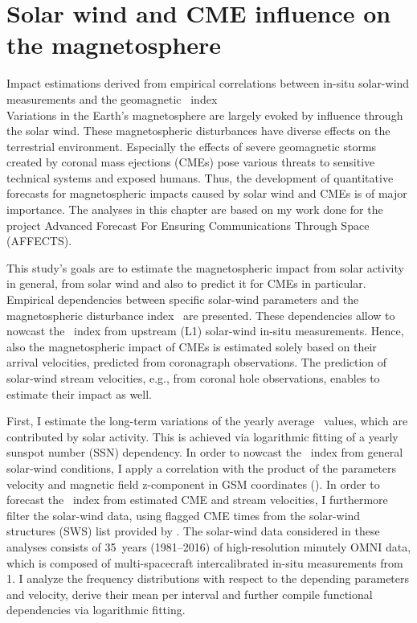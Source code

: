 
\chapter{Solar wind and CME influence on the magnetosphere}
\label{chap:chapter2}

Impact estimations derived from empirical correlations between in-situ solar-wind measurements and the geomagnetic \Kp{}~index\\


Variations in the Earth's magnetosphere are largely evoked by influence through the solar wind. These magnetospheric disturbances have diverse effects on the terrestrial environment. Especially the effects of severe geomagnetic storms created by coronal mass ejections (CMEs) pose various threats to sensitive technical systems and exposed humans. Thus, the development of quantitative forecasts for magnetospheric impacts caused by solar wind and CMEs is of major importance. The analyses in this chapter are based on my work done for the project Advanced Forecast For Ensuring Communications Through Space (AFFECTS).

This study's goals are to estimate the magnetospheric impact from solar activity in general, from solar wind and also to predict it for CMEs in particular. Empirical dependencies between specific solar-wind parameters and the magnetospheric disturbance index~\Kp{} are presented. These dependencies allow to nowcast the \Kp~index from upstream (L1) solar-wind in-situ measurements. Hence, also the magnetospheric impact of CMEs is estimated solely based on their arrival velocities, predicted from coronagraph observations. The prediction of solar-wind stream velocities, e.g., from coronal hole observations, enables to estimate their impact as well.

First, I estimate the long-term variations of the yearly average \Kp{}~values, which are contributed by solar activity. This is achieved via logarithmic fitting of a yearly sunspot number (SSN) dependency. In order to nowcast the \Kp~index from general solar-wind conditions, I apply a correlation with the product of the parameters velocity and magnetic field z-component in GSM coordinates (\vBz{}). In order to forecast the \Kp~index from estimated CME and stream velocities, I furthermore filter the solar-wind data, using flagged CME times from the solar-wind structures (SWS) list provided by \citet{Richardson2012}. The solar-wind data considered in these analyses consists of 35~years (1981--2016) of high-resolution minutely OMNI data, which is composed of multi-spacecraft intercalibrated in-situ measurements from \SI{1}{\au}. I analyze the \Kp{} frequency distributions with respect to the depending parameters \vBz{} and velocity, derive their mean \Kp{} per interval and further compile functional dependencies via logarithmic fitting.

